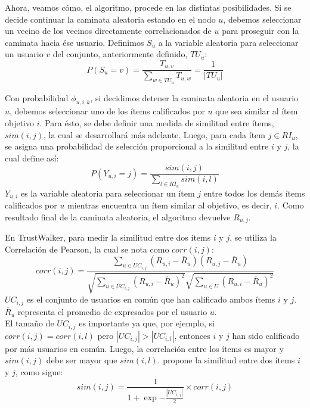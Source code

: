 			Ahora, veamos cómo, el algoritmo, procede en las distintas posibilidades. Si se decide continuar la caminata aleatoria estando en el nodo $u$, debemos seleccionar un vecino de los vecinos directamente correlacionados de $u$ para proseguir con la caminata hacia ése usuario. Definimos $S_u$ a la variable aleatoria para seleccionar un usuario $v$ del conjunto, anteriormente definido, $TU_u$:
			\begin{equation}
				P(S_u = v) = \frac{T_{u,v}}{\sum_{w \in TU_u} T_{u,w}} = \frac{1}{|TU_u|}
			\end{equation}
			
			Con probabilidad $\phi_{u,i,k}$, si decidimos detener la caminata aleatoria en el usuario $u$, debemos seleccionar uno de los ítems calificados por $u$ que sea similar al ítem objetivo $i$. Para ésto, se debe definir una medida de similitud entre ítems, $sim(i,j)$, la cual se desarrollará más adelante. Luego, para cada ítem $j \in RI_u$, se asigna una probabilidad de selección proporcional a la similitud entre $i$ y $j$, la cual \cite{jamali2009} define así:
			\begin{equation}
				P(Y_{u,i} = j) = \frac{sim(i,j)}{\sum_{l \in RI_u} sim(i,l)}
			\end{equation}
			$Y_{u,i}$ es la variable aleatoria para seleccionar un ítem $j$ entre todos los demás ítems calificados por $u$ mientras encuentra un ítem similar al objetivo, es decir, $i$. Como resultado final de la caminata aleatoria, el algoritmo devuelve $R_{u,j}$. \par
			
			En TrustWalker, para medir la similitud entre dos ítems $i$ y $j$, se utiliza la Correlación de Pearson, la cual se nota como $corr(i,j)$:
			\begin{equation}
				corr(i,j) = \frac{\sum_{u \in UC_{i,j}} (R_{u,i} - \overline{R}_u)(R_{u,j} - \overline{R}_u)}{\sqrt{\sum_{u \in UC_{i,j}} (R_{u,i} - \overline{R}_u)^2}\sqrt{\sum_{u \in U} (R_{u,i} - \overline{R}_u)^2}}
			\end{equation}		
			$UC_{i,j}$ es el conjunto de usuarios en común que han calificado ambos ítems $i$ y $j$. $\overline{R}_u$ representa el promedio de expresados por el usuario $u$. \\
			
			El tamaño de $UC_{i,j}$ es importante ya que, por ejemplo, si $corr(i,j) = corr(i,l)$ pero $|UC_{i,j}| > |UC_{i,l}|$, entonces $i$ y $j$ han sido calificado por más usuarios en común. Luego, la correlación entre los ítems es mayor y $sim(i,j)$ debe ser mayor que $sim(i,l)$. \cite{jamali2009} propone la similitud entre dos ítems $i$ y $j$, como sigue:
			\begin{equation}
				sim(i,j) = \frac{1}{1 + \exp{-\frac{|UC_{i,j}|}{2}}} \times corr(i,j)
			\end{equation}
			 